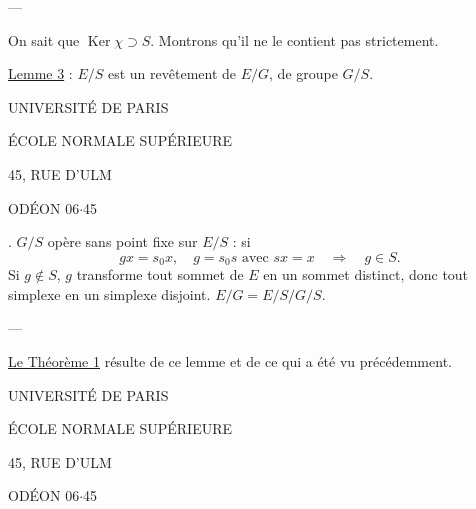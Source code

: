 ---

On sait que $\operatorname{Ker}\chi\supset S$. Montrons qu'il ne le contient pas strictement.

\uline{Lemme 3} : $E/S$ est un revêtement de $E/G$, de groupe $G/S$.

\begin{center}
UNIVERSITÉ DE PARIS


ÉCOLE NORMALE SUPÉRIEURE


45, RUE D'ULM

ODÉON 06$\cdot$45

\end{center}

. $G/S$ opère sans point fixe sur $E/S$ : si
\[
gx=s_0x,\quad g=s_0s\text{ avec }sx=x\quad\Rightarrow\quad g\in S.
\]
Si $g\notin S$, $g$ transforme tout sommet de $E$ en un sommet distinct, donc tout simplexe en un simplexe disjoint. $E/G=E/S\big/G/S$.

---

\uline{Le Théorème 1}  résulte de ce lemme et de ce qui a été vu précédemment.



\begin{center}
UNIVERSITÉ DE PARIS


ÉCOLE NORMALE SUPÉRIEURE


45, RUE D'ULM

ODÉON 06$\cdot$45

\end{center}

